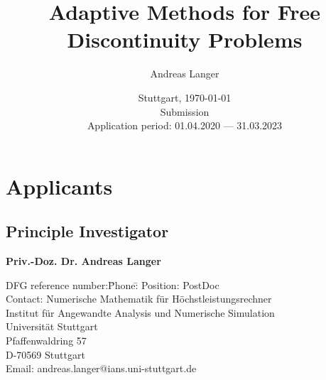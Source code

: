 \documentclass[enabledeprecatedfontcommands,cleardoublepage=empty,headsepline,twoside,11pt,DIV=15,BCOR=12mm,final]{scrartcl}
\begin{document}
\begin{titlepage}\sffamily
  \subject{DFG Research Grant Application} 
  \title{Adaptive Methods for Free Discontinuity Problems}%
  
  \author{Andreas Langer}
  \date{Stuttgart, \today \\[50mm] Submission\\[50mm]
    Application period: 01.04.2020 --- 31.03.2023}
\end{titlepage}

\maketitle[-1]
\cleardoublepage
\setcounter{page}{1}
\pagestyle{scrheadings}


\section*{Applicants}

\subsection*{Principle Investigator}

\begin{flushleft}
  \textbf{Priv.-Doz. Dr. Andreas Langer}
  \begin{tabbing}
    DFG reference number:\quad\=Phone:\quad\=\kill
    Position:\>  PostDoc\\
    Contact:\> Numerische Mathematik f\"ur H\"ochstleistungsrechner\\ 
    \>Institut f\"ur Angewandte Analysis und Numerische Simulation\\
    \> Universit\"at Stuttgart\\
    \> Pfaffenwaldring 57 \\
    \> D-70569 Stuttgart\\[1mm]
    \> Email:\> andreas.langer@ians.uni-stuttgart.de\\[1mm]
 \end{tabbing}
\end{flushleft}


\end{document}
